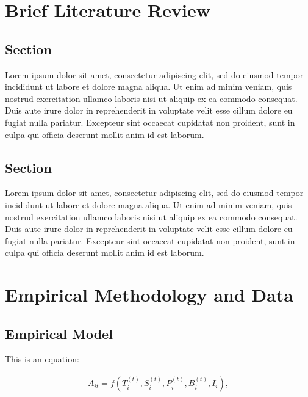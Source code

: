 \documentclass[12pt,preprint, authoryear]{article}
\numberwithin{equation}{section}
\numberwithin{figure}{section}
\numberwithin{table}{section}
\begin{document}
\section{\texorpdfstring{Brief Literature Review
\label{Lit}}{Brief Literature Review }}\label{brief-literature-review}

\subsection{Section}\label{section}

Lorem ipsum dolor sit amet, consectetur adipiscing elit, sed do eiusmod
tempor incididunt ut labore et dolore magna aliqua. Ut enim ad minim
veniam, quis nostrud exercitation ullamco laboris nisi ut aliquip ex ea
commodo consequat. Duis aute irure dolor in reprehenderit in voluptate
velit esse cillum dolore eu fugiat nulla pariatur. Excepteur sint
occaecat cupidatat non proident, sunt in culpa qui officia deserunt
mollit anim id est laborum.

\subsection{Section}\label{section-1}

Lorem ipsum dolor sit amet, consectetur adipiscing elit, sed do eiusmod
tempor incididunt ut labore et dolore magna aliqua. Ut enim ad minim
veniam, quis nostrud exercitation ullamco laboris nisi ut aliquip ex ea
commodo consequat. Duis aute irure dolor in reprehenderit in voluptate
velit esse cillum dolore eu fugiat nulla pariatur. Excepteur sint
occaecat cupidatat non proident, sunt in culpa qui officia deserunt
mollit anim id est laborum.

\section{\texorpdfstring{Empirical Methodology and Data
\label{Data}}{Empirical Methodology and Data }}\label{empirical-methodology-and-data}

\subsection{\texorpdfstring{Empirical Model
\label{Model}}{Empirical Model }}\label{empirical-model}

This is an equation:

\begin{align} \label{eq:EP1}
A_{it}=f(T_i^{(t)},S_i^{(t)},P_i^{(t)},B_i^{(t)},I_i),
\end{align}
\end{document}
